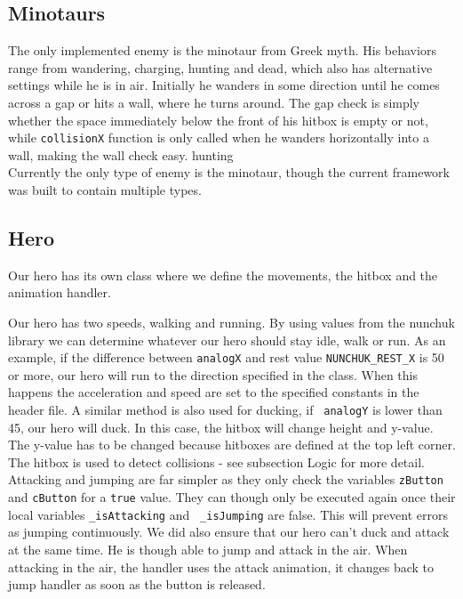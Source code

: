 \subsection{Minotaurs} %
The only implemented enemy is the minotaur from Greek myth. His behaviors range from wandering, charging, hunting and dead, which also has alternative settings while he is in air. Initially he wanders in some direction until he comes across a gap or hits a wall, where he turns around. The gap check is simply whether the space immediately below the front of his hitbox is empty or not, while {\tt collisionX} function is only called when he wanders horizontally into a wall, making the wall check easy.
hunting\\
Currently the only type of enemy is the minotaur, though the current framework was built to contain multiple types.

\subsection{Hero}
Our hero has its own class where we define the movements, the hitbox and
the animation handler.

Our hero has two speeds, walking and running. By using values from
the nunchuk library we can determine whatever our hero should stay idle, walk or run.
As an example, if the difference between {\tt analogX} and rest value {\tt NUNCHUK\_REST\_X}
is 50 or more, our hero will run to the direction specified in the class. When
this happens the acceleration and speed are set to the specified constants
in the header file.  A similar method is also used for ducking, if {\tt
analogY} is lower than 45, our hero will duck. In this case, the hitbox will
change height and y-value. The y-value has to be changed because hitboxes are
defined at the top left corner. The hitbox is used to detect collisions - see subsection
Logic for more detail.
\\

Attacking and jumping are far simpler as they only check the
variables {\tt zButton} and {\tt cButton} for a {\tt true} value. They can though only
be executed again once their local variables {\tt \_isAttacking} and {\tt
\_isJumping} are false. This will prevent errors as jumping
continuously. We did also ensure that our hero can't duck and attack at the same
time. He is though able to jump and attack in the air. When attacking in the air,
the handler uses the attack animation, it changes back to jump handler as soon as
the button is released.

